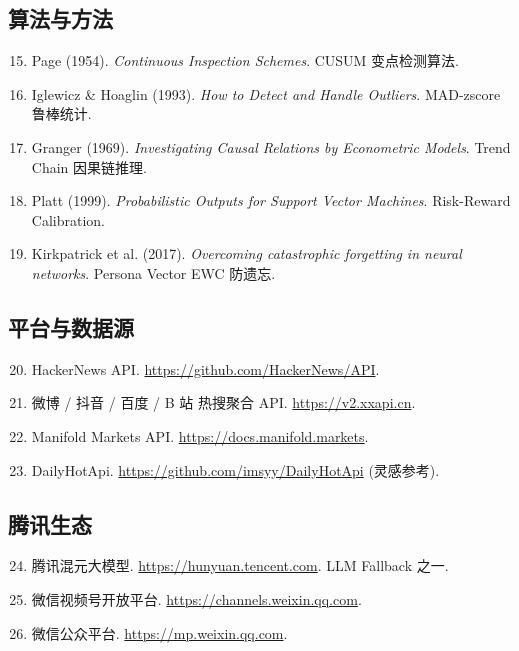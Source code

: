 \subsection{算法与方法}

\begin{enumerate}
    \setcounter{enumi}{14}
    \item Page (1954). \textit{Continuous Inspection Schemes}. CUSUM 变点检测算法.
    \item Iglewicz \& Hoaglin (1993). \textit{How to Detect and Handle Outliers}. MAD-zscore 鲁棒统计.
    \item Granger (1969). \textit{Investigating Causal Relations by Econometric Models}. Trend Chain 因果链推理.
    \item Platt (1999). \textit{Probabilistic Outputs for Support Vector Machines}. Risk-Reward Calibration.
    \item Kirkpatrick et al. (2017). \textit{Overcoming catastrophic forgetting in neural networks}. Persona Vector EWC 防遗忘.
\end{enumerate}

\subsection{平台与数据源}

\begin{enumerate}
    \setcounter{enumi}{19}
    \item HackerNews API. \url{https://github.com/HackerNews/API}.
    \item 微博 / 抖音 / 百度 / B 站 热搜聚合 API. \url{https://v2.xxapi.cn}.
    \item Manifold Markets API. \url{https://docs.manifold.markets}.
    \item DailyHotApi. \url{https://github.com/imsyy/DailyHotApi} (灵感参考).
\end{enumerate}

\subsection{腾讯生态}

\begin{enumerate}
    \setcounter{enumi}{23}
    \item 腾讯混元大模型. \url{https://hunyuan.tencent.com}. LLM Fallback 之一.
    \item 微信视频号开放平台. \url{https://channels.weixin.qq.com}.
    \item 微信公众平台. \url{https://mp.weixin.qq.com}.
\end{enumerate}

